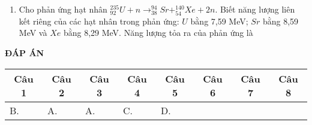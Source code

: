 \begin{enumerate}
{		
	}
	\item {Cho phản ứng hạt nhân $^{235}_{92} U + n \longrightarrow ^{94}_{38} Sr + ^{140}_{54} Xe + 2n$. Biết năng lượng liên kết riêng của các hạt nhân trong phản ứng: $U$ bằng 7,59 MeV; $Sr$ bằng 8,59 MeV và $Xe$ bằng 8,29 MeV. Năng lượng tỏa ra của phản ứng là
	}
\end{enumerate}
\textbf{ĐÁP ÁN}
\begin{longtable}[\textwidth]{|p{}|p{}|p{}|p{}|p{}|p{}|p{}|p{}|}
	\hline%
	\multicolumn{1}{|c|}{\textbf{Câu 1}} & \multicolumn{1}{c|}{\textbf{Câu 2}} & \multicolumn{1}{c|}{\textbf{Câu 3}} &
	\multicolumn{1}{c|}{\textbf{Câu 4}} &
	\multicolumn{1}{c|}{\textbf{Câu 5}} &
	\multicolumn{1}{c|}{\textbf{Câu 6}} &
	\multicolumn{1}{c|}{\textbf{Câu 7}} &
	\multicolumn{1}{c|}{\textbf{Câu 8}} \\
	\hline
	B.&A. &A. &C. &D. & & &\\
	\hline
\end{longtable} 

